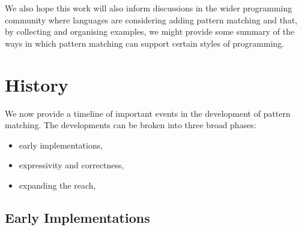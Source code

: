 \documentclass[acmsmall]{acmart}
\begin{document}
We also hope this work will also inform discussions in the wider programming community where languages are considering adding pattern matching and that, by collecting and organising examples, we might provide some summary of the ways in which pattern matching can support certain styles of programming.

\section{History}
We now provide a timeline of important events in the development of pattern matching.  The developments can be broken into three broad phases:
\begin{itemize}
    \item early implementations,
    \item expressivity and correctness,
    \item expanding the reach,
\end{itemize}

\subsection{Early Implementations}
\end{document}
